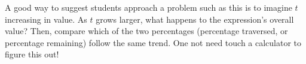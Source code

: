A good way to suggest students approach a problem such as this is to imagine $t$ increasing in value.  As $t$ grows larger, what happens to the expression's overall value?  Then, compare which of the two percentages (percentage traversed, or percentage remaining) follow the same trend.  One not need touch a calculator to figure this out!




